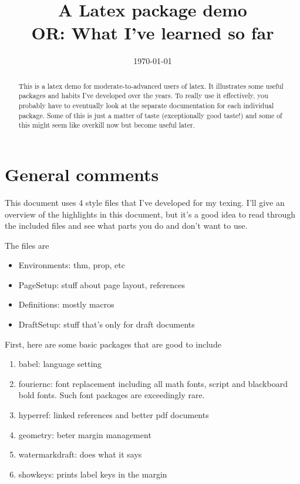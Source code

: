 \documentclass[11pt,oneside,draft]{amsart}
\title[Latex package demo]{A Latex package demo\\ OR: What I've learned so far}
\date{\today}
\begin{document}
\begin{abstract}
  This is a latex demo for moderate-to-advanced users of latex.  It illustrates
  some useful packages and habits I've developed over the years.  To
  really use it effectively, you probably have to eventually look at
  the separate documentation for each individual package.  Some of
  this is just a matter of taste (exceptionally good taste!) and some
  of this might seem like overkill now but become useful later.
\end{abstract}

\maketitle

\tableofcontents

\section{General comments}

This document uses 4 style files that I've developed for my texing.
I'll give an overview of the highlights in this document, but it's a
good idea to read through the included files and see what parts you do
and don't want to use.

The files are
\begin{itemize}
\item Environments: thm, prop, etc
\item PageSetup: stuff about page layout, references
\item Definitions: mostly macros
\item DraftSetup: stuff that's only for draft documents
\end{itemize}

First, here are some basic packages that are good to include
\begin{enumerate}
\item babel: language setting
\item fouriernc: font replacement including all math fonts, script and
  blackboard bold fonts.  Such font packages are exceedingly rare.
\item hyperref: linked references and better pdf documents
\item geometry: beter margin management
\item watermarkdraft: does what it says
\item showkeys: prints label keys in the margin
\end{enumerate}
\end{document}
